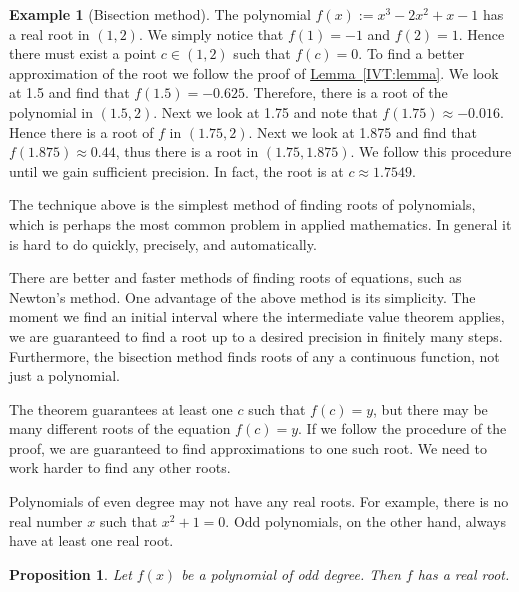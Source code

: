 \documentclass[12pt]{book}
\theoremstyle{plain}
\newtheorem{prop}[thm]{Proposition}
\theoremstyle{remark}
\theoremstyle{definition}
\theoremstyle{exercise}
\theoremstyle{example}
\newtheorem{example}[thm]{Example}
\newcommand{\lemmaref}[1]{\hyperref[#1]{Lemma~\ref*{#1}}}
\begin{document}
\begin{example}[Bisection method] %
The polynomial $f(x) := x^3-2x^2+x-1$ has a real root in $(1,2)$.  We simply
notice that $f(1) = -1$ and $f(2) = 1$.  Hence there must exist a point $c
\in (1,2)$ such that $f(c) = 0$.  To find a better approximation of
the root we follow the proof of \lemmaref{IVT:lemma}.  
We look at 1.5 and find that $f(1.5) = -0.625$.  Therefore,
there is a root of the polynomial in $(1.5,2)$.  Next we look at 1.75
and note that $f(1.75) \approx -0.016$.  Hence there is a root of $f$ in
$(1.75,2)$.  Next we look at 1.875 and find that $f(1.875) \approx 0.44$,
thus there is a root in $(1.75,1.875)$.  We follow this procedure until we gain
sufficient precision.  In fact, the root is at $c \approx 1.7549$.
\end{example}

The technique above is the simplest method of finding roots of polynomials,
which is perhaps the most common problem in applied
mathematics.  In general it is hard to do quickly, precisely,
and automatically.

There are better and faster methods of finding roots of equations, such
as Newton's method.  One advantage of the above method is its
simplicity.  The
moment we find an initial interval where the intermediate value theorem
applies, we are guaranteed to find a root up to a desired
precision in finitely many steps.  Furthermore, the bisection
method finds
roots of any
a continuous function, not just a polynomial.

The theorem guarantees at least one $c$ such that $f(c) = y$, but there
may be many different roots of the equation $f(c) = y$.  If we follow
the procedure of the proof, we are guaranteed to find approximations to
one such root.  We need to work harder to find any other roots.

\medskip

Polynomials of even degree may not have any real roots.  For example,
there is no real number $x$ such that $x^2+1 = 0$.  Odd polynomials, on the
other hand, always have at least one real root.

\begin{prop}
Let $f(x)$ be a polynomial of odd degree.  Then $f$ has a real root.
\end{prop}
\end{document}

